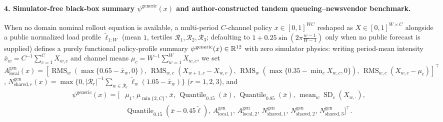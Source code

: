 \paragraph{4. Simulator-free black-box summary $\psi^{\mathrm{generic}}(x)$ and author-constructed tandem queueing--newsvendor benchmark.}
When no domain nominal rollout equation is available, a multi-period $C$-channel policy $x \in [0,1]^{W C}$ reshaped as $X \in [0,1]^{W \times C}$ alongside a public normalized load profile $\tilde{\ell}_{1:W}$ (mean $1$, tertiles $\mathcal{R}_1, \mathcal{R}_2, \mathcal{R}_3$; defaulting to $1 + 0.25\sin(2\pi\frac{w-1}{W-1})$ only when no public forecast is supplied) defines a purely functional policy-profile summary $\psi^{\mathrm{generic}}(x) \in \mathbb{R}^{12}$ with zero simulator physics: writing period-mean intensity $\bar{x}_w = C^{-1}\sum_{c=1}^C X_{w,c}$ and channel means $\mu_c = W^{-1}\sum_{w=1}^W X_{w,c}$, we set $A_{\mathrm{local}}^{\mathrm{gen}}(x) = [\operatorname{RMS}_w(\max\{0.65 - \bar{x}_w, 0\}),\, \operatorname{RMS}_{w,c}(X_{w+1,c} - X_{w,c}),\, \operatorname{RMS}_w(\max\{0.35 - \min_c X_{w,c}, 0\}),\, \operatorname{RMS}_{w,c}(X_{w,c} - \mu_c)]^\top$, $N_{\mathrm{shared},r}^{\mathrm{gen}}(x) = \max\{0, |\mathcal{R}_r|^{-1}\sum_{w\in\mathcal{R}_r}\tilde{\ell}_w(1.05 - \bar{x}_w)\}$ ($r=1,2,3$), and
\begin{align*}
  \psi^{\mathrm{generic}}(x) = \Big[&\mu_1,\, \mu_{\min\{2,C\}},\, \bar{x},\, \operatorname{Quantile}_{0.15}(\bar{x}),\, \operatorname{Quantile}_{0.85}(\bar{x}),\, \operatorname{mean}_w\operatorname{SD}_c(X_{w,\cdot}), \\
  &\operatorname{Quantile}_{0.15}(\bar{x} - 0.45\tilde{\ell}),\, A_{\mathrm{local},1}^{\mathrm{gen}},\, A_{\mathrm{local},2}^{\mathrm{gen}},\, N_{\mathrm{shared},1}^{\mathrm{gen}},\, N_{\mathrm{shared},2}^{\mathrm{gen}},\, N_{\mathrm{shared},3}^{\mathrm{gen}}\Big]^\top.
\end{align*}
